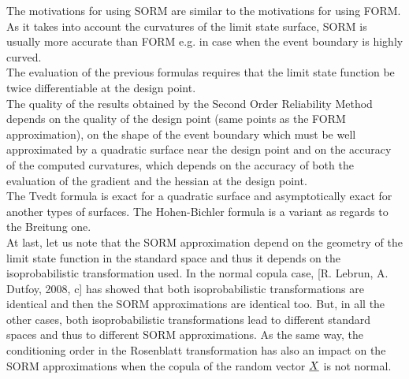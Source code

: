 {
  The motivations for using SORM are similar to the motivations for using FORM. As it takes into account the curvatures of the limit state surface, SORM is usually more accurate than FORM e.g. in case when the event boundary is highly curved.\\

  The evaluation of the previous formulas requires that the limit state function be twice differentiable at the design point.\\

  The quality of the results obtained by the Second Order Reliability Method depends on the quality of the design point (same points as the FORM approximation), on the shape of the event boundary which must be well approximated by a quadratic surface near the design point and on the accuracy of the computed curvatures, which depends on the accuracy of both the evaluation of the gradient and the hessian at the design point.\\

  The Tvedt formula is exact for a quadratic surface and asymptotically exact for another types of surfaces. The Hohen-Bichler formula is a variant as regards to the Breitung one.\\

  At last, let us note that the SORM approximation depend on the geometry of the limit state function in the standard space and thus it depends on the isoprobabilistic transformation used. In the normal copula case, [R. Lebrun, A. Dutfoy, 2008, c] has showed that both isoprobabilistic transformations are identical and then the SORM approximations are identical too. But, in all the other cases, both isoprobabilistic transformations lead to different standard spaces and thus to different SORM approximations. As the same way, the conditioning order in the Rosenblatt transformation has also an impact on the SORM approximations when the copula of the random vector ${\underline{X}}$ is not normal.\\

}
